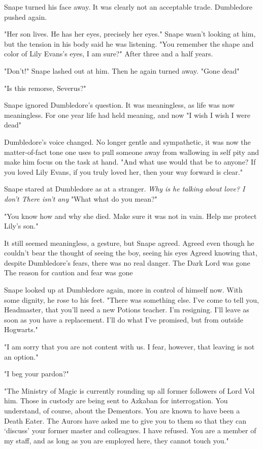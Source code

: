 Snape turned his face away. It was clearly not an acceptable trade. Dumbledore pushed again.

"Her son lives. He has her eyes, precisely her eyes." Snape wasn't looking at him, but the tension in his body said he was listening. "You remember the shape and color of Lily Evans's eyes, I am sure?" After three and a half years.

"Don't!" Snape lashed out at him. Then he again turned away. "Gone{\el} dead{\el}"

"Is this remorse, Severus?"

Snape ignored Dumbledore's question. It was meaningless, as life was now meaningless. For one year life had held meaning, and now{\el} "I wish{\el} I wish I were dead{\el}"

Dumbledore's voice changed. No longer gentle and sympathetic, it was now the matter-of-fact tone one uses to pull someone away from wallowing in self pity and make him focus on the task at hand. "And what use would that be to anyone? If you loved Lily Evans, if you truly loved her, then your way forward is clear."

Snape stared at Dumbledore as at a stranger. \emph{Why is he talking about love? I don't{\el} There isn't any{\el}} "What{\el} what do you mean?"

"You know how and why she died. Make sure it was not in vain. Help me protect Lily's son."

It still seemed meaningless, a gesture, but Snape agreed. Agreed even though he couldn't bear the thought of seeing the boy, seeing his eyes{\el} Agreed knowing that, despite Dumbledore's fears, there was no real danger. The Dark Lord was gone{\el} The reason for caution and fear was gone{\el}

Snape looked up at Dumbledore again, more in control of himself now. With some dignity, he rose to his feet. "There was something else. I've come to tell you, Headmaster, that you'll need a new Potions teacher. I'm resigning. I'll leave as soon as you have a replacement. I'll do what I've promised, but from outside Hogwarts."

"I am sorry that you are not content with us. I fear, however, that leaving is not an option."

"I beg your pardon?"

"The Ministry of Magic is currently rounding up all former followers of Lord Vol{\el} him. Those in custody are being sent to Azkaban for interrogation. You understand, of course, about the Dementors. You are known to have been a Death Eater. The Aurors have asked me to give you to them so that they can `discuss' your former master and colleagues. I have refused. You are a member of my staff, and as long as you are employed here, they cannot touch you."

